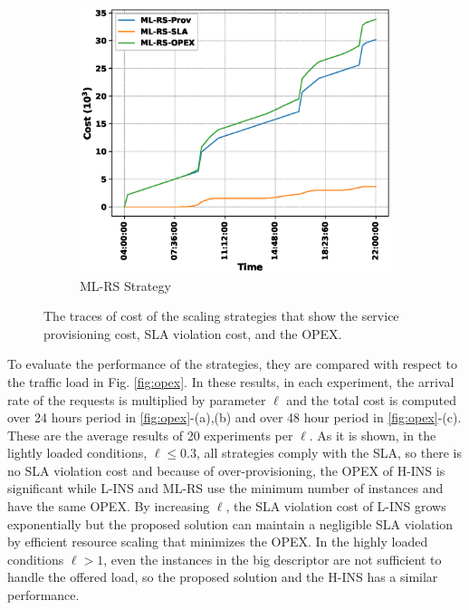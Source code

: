\documentclass[conference, final]{IEEEtran}
\begin{document}
{\begin{figure}
\hfill
\begin{subfigure}[h]{0.32\linewidth}
\includegraphics[width=\linewidth]{./figures/ML-RScost_trace.eps}
\caption{{\textsf{ML-RS}} Strategy}
\end{subfigure}
\caption{The traces of cost of the scaling strategies that show the service provisioning cost, SLA violation cost, and the OPEX.}
\label{fig:cost_trace}
\end{figure}

To evaluate the performance of the strategies, they are compared with respect to the traffic load in Fig. \ref{fig:opex}. In these results, in each experiment, the arrival rate of the requests is multiplied by parameter $\ell$ and the total cost is computed over 24 hours period in \ref{fig:opex}-(a),(b) and over 48 hour period in \ref{fig:opex}-(c). These are the average results of 20 experiments per $\ell$. As it is shown, in the lightly loaded conditions, $\ell \leq 0.3$, all strategies comply with the SLA, so there is no SLA violation cost and because of over-provisioning, the OPEX of {\small \textsf{H-INS}} is significant while {\small \textsf{L-INS}} and {\small \textsf{ML-RS}} use the minimum number of instances and have the same OPEX. By increasing $\ell$, the SLA violation cost of {\small \textsf{L-INS}} grows exponentially but the proposed solution can maintain a negligible SLA violation by efficient resource scaling that minimizes the OPEX. In the highly loaded conditions $\ell > 1$, even the instances in the big descriptor are not sufficient to handle the offered load, so the proposed solution and the {\small \textsf{H-INS}} has a similar performance.

}
\end{document}
